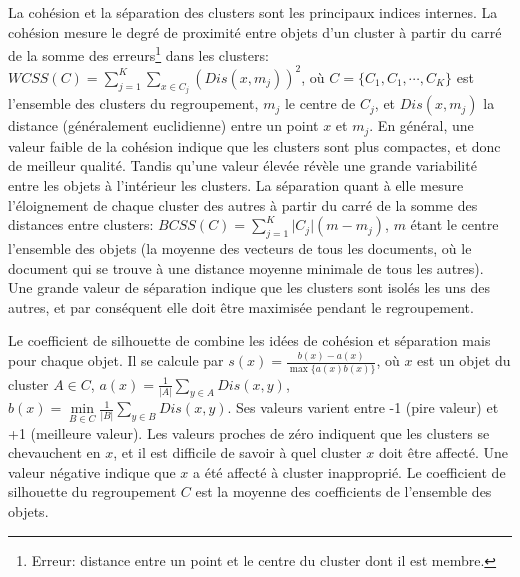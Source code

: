  La cohésion et la séparation des clusters sont les principaux indices internes. La cohésion mesure le degré de proximité entre objets d'un cluster à partir du carré de la somme des erreurs\footnote{Erreur: distance entre un point et le centre du cluster dont il est membre.} dans les clusters: $WCSS(C) = \sum\limits_{j=1}^K\sum\limits_{x \in C_j} (Dis(x, m_j))^2$, où $C = \lbrace C_1, C_1, \cdots, C_K \rbrace$ est l'ensemble des clusters du regroupement, $m_j$ le centre de $C_j$, et $Dis(x,m_j)$ la distance (généralement euclidienne) entre un point $x$ et $m_j$. En général, une valeur faible de la cohésion indique que les clusters sont plus compactes, et donc de meilleur qualité. Tandis qu'une valeur élevée révèle une grande variabilité entre les objets à l'intérieur les clusters. La séparation quant à elle mesure l'éloignement de chaque cluster des autres à partir du carré de la somme des distances entre clusters: $BCSS(C) = \sum\limits_{j = 1}^{K} \vert C_j \vert (m - m_j)$, 
  $m$ étant le centre l'ensemble des objets (la moyenne des vecteurs de tous les documents, où le document qui se trouve à une distance moyenne minimale de tous les autres). Une grande valeur de séparation indique que les clusters sont isolés les uns des autres, et par conséquent elle doit être maximisée pendant le regroupement.
 
 Le coefficient de silhouette de \citet{rousseeuw1987silhouetteclusternumber} combine les idées de cohésion et séparation mais pour chaque objet. Il se calcule par $s(x) = \frac{b(x
) - a(x)}{\max\lbrace a(x)b(x) \rbrace}$, où $x$ est un objet du cluster $A \in C$, $a(x) = \frac{1}{\vert A \vert} \sum\limits_{y\in A} Dis(x,y)$, $b(x) = \min\limits_{B \in C}\frac{1}{\vert B \vert} \sum\limits_{y\in B} Dis(x,y)$. Ses valeurs varient entre -1 (pire valeur) et +1 (meilleure valeur). Les valeurs proches de zéro indiquent que les clusters se chevauchent en $x$, et il est difficile de savoir à quel cluster $x$ doit être affecté. Une valeur négative indique que $x$ a été affecté à cluster inapproprié. Le coefficient de silhouette du regroupement $C$ est la moyenne des coefficients de l'ensemble des  objets.



